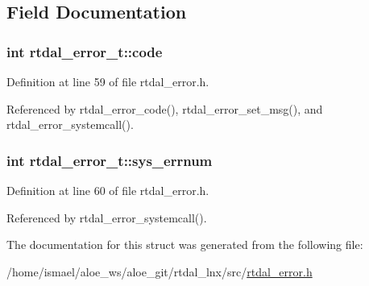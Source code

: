 \subsection{Field Documentation}
\hypertarget{structrtdal__error__t_afef22b8ccca8067d63155dc9d823cd88}{
\subsubsection[{code}]{\setlength{\rightskip}{0pt plus 5cm}int rtdal\-\_\-error\-\_\-t\-::code}}\label{structrtdal__error__t_afef22b8ccca8067d63155dc9d823cd88}


Definition at line 59 of file rtdal\-\_\-error.\-h.



Referenced by rtdal\-\_\-error\-\_\-code(), rtdal\-\_\-error\-\_\-set\-\_\-msg(), and rtdal\-\_\-error\-\_\-systemcall().

\hypertarget{structrtdal__error__t_aba3aa24fa1a3c37942b90a8b63f214c4}{
\subsubsection[{sys\-\_\-errnum}]{\setlength{\rightskip}{0pt plus 5cm}int rtdal\-\_\-error\-\_\-t\-::sys\-\_\-errnum}}\label{structrtdal__error__t_aba3aa24fa1a3c37942b90a8b63f214c4}


Definition at line 60 of file rtdal\-\_\-error.\-h.



Referenced by rtdal\-\_\-error\-\_\-systemcall().



The documentation for this struct was generated from the following file\-:\begin{DoxyCompactItemize}
\item 
/home/ismael/aloe\-\_\-ws/aloe\-\_\-git/rtdal\-\_\-lnx/src/\hyperlink{rtdal__error_8h}{rtdal\-\_\-error.\-h}\end{DoxyCompactItemize}
